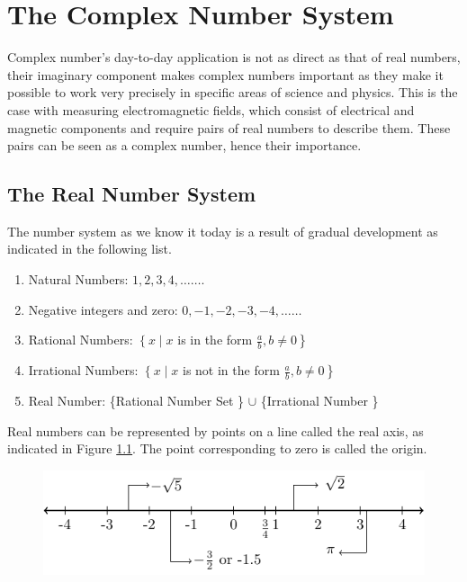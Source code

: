 \chapter{The Complex Number System}
\noindent Complex number's day-to-day application is not as direct as that of real numbers, their imaginary component makes complex numbers important as they make it possible to work very precisely in specific areas of science and physics. This is the case with measuring electromagnetic fields, which consist of electrical and magnetic components and require pairs of real numbers to describe them. These pairs can be seen as a complex number, hence their importance.
\section{The Real Number System}
The number system as we know it today is a result of gradual development as indicated in the following list.
\begin{enumerate}
    \item Natural Numbers: $1,2,3,4, \ldots \ldots$.
    \item Negative integers and zero: $0,-1,-2,-3,-4, \ldots \ldots$
    \item Rational Numbers:
$\displaystyle \left\{x \mid x\right.$ is in the form $\displaystyle \left.\frac{a}{b}, b \neq 0\right\}$
\item Irrational Numbers:
$\displaystyle \left\{x \mid x\right.$ is not in the form $\displaystyle \left.\frac{a}{b}, b \neq 0\right\}$
\item Real Number:
\{Rational Number Set \} $\cup$ \{Irrational Number \}
\end{enumerate}
\noindent Real numbers can be represented by points on a line called the real axis, as indicated in Figure \ref{fig1}. The point
corresponding to zero is called the origin.
\begin{figure}[ht!]
    \centering
    \includegraphics{FIG_MAT215/FIG1.pdf}
    \caption{}
    \label{fig1}
\end{figure}
